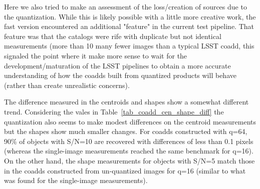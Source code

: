 Here we also tried to make an assessment of the loss/creation of sources due to the quantization.  While this is 
likely possible with a little more creative work, the fast version encountered an additional "feature" in the 
current test pipeline.  That feature was that the catalogs were rife with duplicate but not identical measurements
(more than 10%
many fewer images than a typical LSST coadd, this signaled the point where it make more sense to wait for the 
development/maturation of the LSST pipelines to obtain a more accurate understanding of how the coadds built 
from quantized products will behave (rather than create unrealistic concerns).

The difference measured in the centroids and shapes show a somewhat different trend.  Considering the 
vales in Table~\ref{tab_coadd_cen_shape_diff} the quantization also seems to make modest differences on 
the centroid measurements but the shapes show much smaller changes.  For coadds constructed with q=64, 90\% 
of objects with S/N=10 are recovered with differences of less than 0.1 pixels (whereas the single-image
measurements reached the same benchmark for q=16).  On the other hand, the shape measurements for objects with
S/N=5 match those in the coadds constructed from un-quantized images for q=16 (similar to what was found 
for the single-image measurements).

